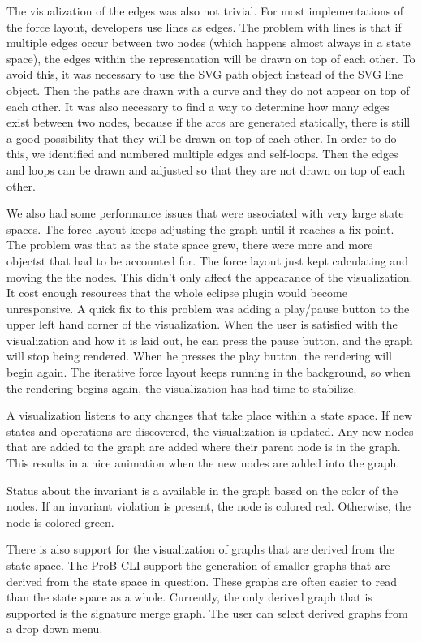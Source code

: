The visualization of the edges was also not trivial. For most implementations of the force layout, developers use lines as edges. The problem with lines is that if multiple edges occur between two nodes (which happens almost always in a state space), the edges within the representation will be drawn on top of each other. To avoid this, it was necessary to use the SVG path object instead of the SVG line object. Then the paths are drawn with a curve and they do not appear on top of each other. It was also necessary to find a way to determine how many edges exist between two nodes, because if the arcs are generated statically, there is still a good possibility that they will be drawn on top of each other. In order to do this, we identified and numbered multiple edges and self-loops. Then the edges and loops can be drawn and adjusted so that they are not drawn on top of each other.

We also had some performance issues that were associated with very large state spaces. The force layout keeps adjusting the graph until it reaches a fix point. The problem was that as the state space grew, there were more and more objectst that had to be accounted for. The force layout just kept calculating and moving the the nodes. This didn't only affect the appearance of the visualization. It cost enough resources that the whole eclipse plugin would become unresponsive. A quick fix to this problem was adding a play/pause button to the upper left hand corner of the visualization. When the user is satisfied with the visualization and how it is laid out, he can press the pause button, and the graph will stop being rendered. When he presses the play button, the rendering will begin again. The iterative force layout keeps running in the background, so when the rendering begins again, the visualization has had time to stabilize.

A visualization listens to any changes that take place within a state space. If new states and operations are discovered, the visualization is updated. Any new nodes that are added to the graph are added where their parent node is in the graph. This results in a nice animation when the new nodes are added into the graph.

Status about the invariant is a available in the graph based on the color of the nodes. If an invariant violation is present, the node is colored red. Otherwise, the node is colored green.

There is also support for the visualization of graphs that are derived from the state space. The ProB CLI support the generation of smaller graphs that are derived from the state space in question. These graphs are often easier to read than the state space as a whole. Currently, the only derived graph that is supported is the signature merge graph. The user can select derived graphs from a drop down menu.

